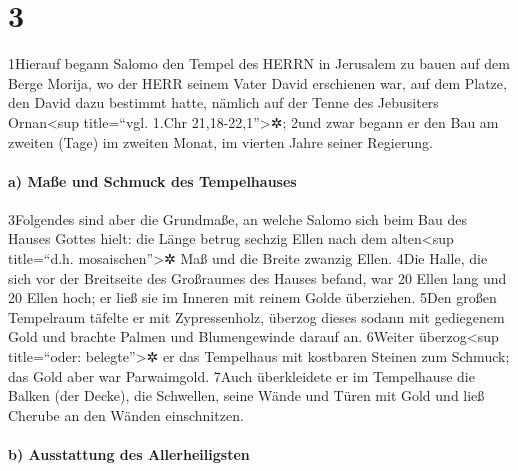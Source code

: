 \hypertarget{section-2}{%
\section{3}\label{section-2}}

1Hierauf begann Salomo den Tempel des HERRN in Jerusalem zu bauen auf
dem Berge Morija, wo der HERR seinem Vater David erschienen war, auf dem
Platze, den David dazu bestimmt hatte, nämlich auf der Tenne des
Jebusiters Ornan\textless sup title=``vgl. 1.Chr
21,18-22,1''\textgreater✲; 2und zwar begann er den Bau am zweiten (Tage)
im zweiten Monat, im vierten Jahre seiner Regierung.

\hypertarget{a-mauxdfe-und-schmuck-des-tempelhauses}{%
\paragraph{a) Maße und Schmuck des
Tempelhauses}\label{a-mauxdfe-und-schmuck-des-tempelhauses}}

3Folgendes sind aber die Grundmaße, an welche Salomo sich beim Bau des
Hauses Gottes hielt: die Länge betrug sechzig Ellen nach dem
alten\textless sup title=``d.h. mosaischen''\textgreater✲ Maß und die
Breite zwanzig Ellen. 4Die Halle, die sich vor der Breitseite des
Großraumes des Hauses befand, war 20 Ellen lang und 20 Ellen hoch; er
ließ sie im Inneren mit reinem Golde überziehen. 5Den großen Tempelraum
täfelte er mit Zypressenholz, überzog dieses sodann mit gediegenem Gold
und brachte Palmen und Blumengewinde darauf an. 6Weiter
überzog\textless sup title=``oder: belegte''\textgreater✲ er das
Tempelhaus mit kostbaren Steinen zum Schmuck; das Gold aber war
Parwaimgold. 7Auch überkleidete er im Tempelhause die Balken (der
Decke), die Schwellen, seine Wände und Türen mit Gold und ließ Cherube
an den Wänden einschnitzen.

\hypertarget{b-ausstattung-des-allerheiligsten}{%
\paragraph{b) Ausstattung des
Allerheiligsten}\label{b-ausstattung-des-allerheiligsten}}

